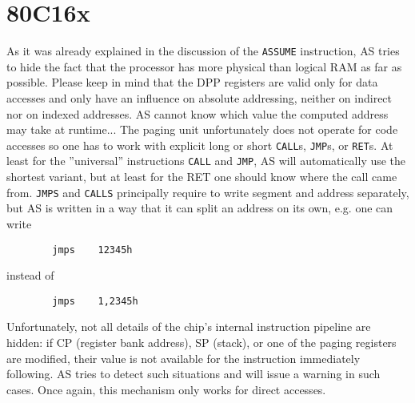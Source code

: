 \documentclass[12pt,twoside]{report}
\newcommand{\tty}[1]{{\tt #1}}
\newcommand{\asname}{{AS}}
\begin{document}

\section{80C16x}

As it was already explained in the discussion of the \tty{ASSUME}
instruction, \asname{} tries to hide the fact that the processor has more
physical than logical RAM as far as possible.  Please keep in mind
that the DPP registers are valid only for data accesses and only
have an influence on absolute addressing, neither on indirect nor on indexed
addresses.  \asname{} cannot know which value the computed address may take
at runtime...
The paging unit unfortunately does not operate for code accesses so
one has to work with explicit long or short \tty{CALL}s, \tty{JMP}s, or
\tty{RET}s.  At least for the ''universal'' instructions \tty{CALL} and
\tty{JMP}, \asname{} will automatically use the shortest variant, but at least for the RET one
should know where the call came from.  \tty{JMPS} and \tty{CALLS} principally
require to write segment and address separately, but \asname{} is written in
a way that it can split an address on its own, e.g. one can write
\begin{verbatim}
        jmps    12345h
\end{verbatim}
instead of
\begin{verbatim}
        jmps    1,2345h
\end{verbatim}
Unfortunately, not all details of the chip's internal instruction
pipeline are hidden: if CP (register bank address), SP (stack), or
one of the paging registers are modified, their value is not
available for the instruction immediately following.  \asname{} tries to
detect such situations and will issue a warning in such cases.  Once
again, this mechanism only works for direct accesses.
\end{document}
